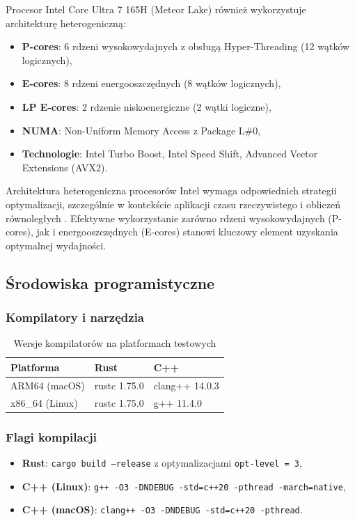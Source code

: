 Procesor Intel Core Ultra 7 165H (Meteor Lake) również wykorzystuje architekturę heterogeniczną:
\begin{itemize}
    \item \textbf{P-cores}: 6 rdzeni wysokowydajnych z obsługą Hyper-Threading (12 wątków logicznych),
    \item \textbf{E-cores}: 8 rdzeni energooszczędnych (8 wątków logicznych),
    \item \textbf{LP E-cores}: 2 rdzenie niskoenergiczne (2 wątki logiczne),
    \item \textbf{NUMA}: Non-Uniform Memory Access z Package L\#0,
    \item \textbf{Technologie}: Intel Turbo Boost, Intel Speed Shift, Advanced Vector Extensions (AVX2).
\end{itemize}
Architektura heterogeniczna procesorów Intel wymaga odpowiednich strategii optymalizacji, szczególnie w kontekście aplikacji czasu rzeczywistego i obliczeń równoległych \cite{intel2022realtime}. Efektywne wykorzystanie zarówno rdzeni wysokowydajnych (P-cores), jak i energooszczędnych (E-cores) stanowi kluczowy element uzyskania optymalnej wydajności.


\subsection{Środowiska programistyczne}

\subsubsection{Kompilatory i narzędzia}

\begin{table}[h]
\centering
\caption{Wersje kompilatorów na platformach testowych}
\begin{tabular}{|l|l|l|}
\hline
\textbf{Platforma} & \textbf{Rust} & \textbf{C++} \\
\hline
ARM64 (macOS) & rustc 1.75.0 & clang++ 14.0.3 \\
x86\_64 (Linux) & rustc 1.75.0 & g++ 11.4.0 \\
\hline
\end{tabular}

\label{tab:compilers}
\end{table}

\subsubsection{Flagi kompilacji}
\begin{itemize}
    \item \textbf{Rust}: \texttt{cargo build --release} z optymalizacjami \texttt{opt-level = 3},
    \item \textbf{C++ (Linux)}: \texttt{g++ -O3 -DNDEBUG -std=c++20 -pthread -march=native},
    \item \textbf{C++ (macOS)}: \texttt{clang++ -O3 -DNDEBUG -std=c++20 -pthread}.
\end{itemize}
